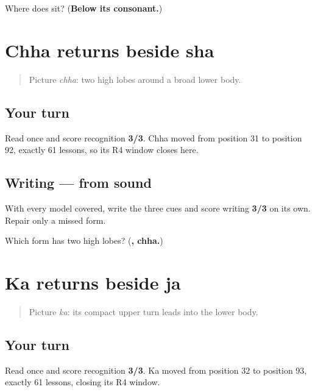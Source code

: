\begin{tcolorbox}[breakable,colback=teal!4,colframe=teal!35!black,title={Before you move on}]
Where does \textbf{} sit? (\textbf{Below its consonant.})
\end{tcolorbox}
\section[\texorpdfstring{\gu{છ} \gu{શ} (chha — sha)}{છ શ (chha — sha)}]{Chha returns beside sha}

\label{lesson:GU-R15-chha-r4}



\begin{quote}
Picture \emph{chha}: two high lobes around a broad lower body.
\end{quote}

\subsection*{Your turn}
Read \textbf{  } once and score recognition \textbf{3/3}. Chha moved from position 31 to position 92, exactly 61 lessons, so its R4 window closes here.

\subsection*{Writing — from sound}
With every model covered, write the three cues and score writing \textbf{3/3} on its own. Repair only a missed form.

\begin{tcolorbox}[breakable,colback=teal!4,colframe=teal!35!black,title={Before you move on}]
Which form has two high lobes? (\textbf{, chha.})
\end{tcolorbox}
\section[\texorpdfstring{\gu{ક} \gu{જ} (ka — ja)}{ક જ (ka — ja)}]{Ka returns beside ja}

\label{lesson:GU-R15-ka-r4}



\begin{quote}
Picture \emph{ka}: its compact upper turn leads into the lower body.
\end{quote}

\subsection*{Your turn}
Read \textbf{  } once and score recognition \textbf{3/3}. Ka moved from position 32 to position 93, exactly 61 lessons, closing its R4 window.

